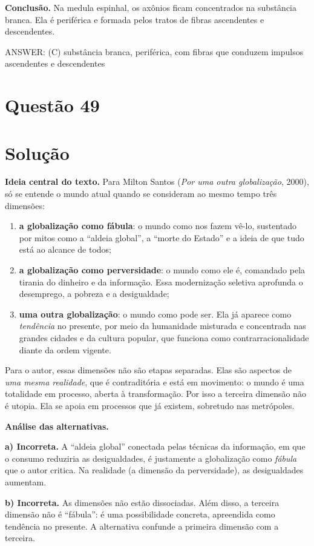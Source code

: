 \documentclass{article}%
\begin{document}
\textbf{Conclusão.} Na medula espinhal, os axônios ficam concentrados na substância branca. Ela é periférica e formada pelos tratos de fibras ascendentes e descendentes.

ANSWER: (C) substância branca, periférica, com fibras que conduzem impulsos ascendentes e descendentes%
\newpage%
\section*{Questão 49}

\section*{Solução}

\textbf{Ideia central do texto.} Para Milton Santos (\emph{Por uma outra globalização}, 2000), só se entende o mundo atual quando se consideram ao mesmo tempo três dimensões:
\begin{enumerate}
\item \textbf{a globalização como fábula}: o mundo como nos fazem vê-lo, sustentado por mitos como a ``aldeia global'', a ``morte do Estado'' e a ideia de que tudo está ao alcance de todos;
\item \textbf{a globalização como perversidade}: o mundo como ele é, comandado pela tirania do dinheiro e da informação. Essa modernização seletiva aprofunda o desemprego, a pobreza e a desigualdade;
\item \textbf{uma outra globalização}: o mundo como pode ser. Ela já aparece como \emph{tendência} no presente, por meio da humanidade misturada e concentrada nas grandes cidades e da cultura popular, que funciona como contrarracionalidade diante da ordem vigente.
\end{enumerate}
Para o autor, essas dimensões não são etapas separadas. Elas são aspectos de \emph{uma mesma realidade}, que é contraditória e está em movimento: o mundo é uma totalidade em processo, aberta à transformação. Por isso a terceira dimensão não é utopia. Ela se apoia em processos que já existem, sobretudo nas metrópoles.

\textbf{Análise das alternativas.}

\textbf{a) Incorreta.} A ``aldeia global'' conectada pelas técnicas da informação, em que o consumo reduziria as desigualdades, é justamente a globalização como \emph{fábula} que o autor critica. Na realidade (a dimensão da perversidade), as desigualdades aumentam.

\textbf{b) Incorreta.} As dimensões não estão dissociadas. Além disso, a terceira dimensão não é ``fábula'': é uma possibilidade concreta, apreendida como tendência no presente. A alternativa confunde a primeira dimensão com a terceira.
\end{document}
